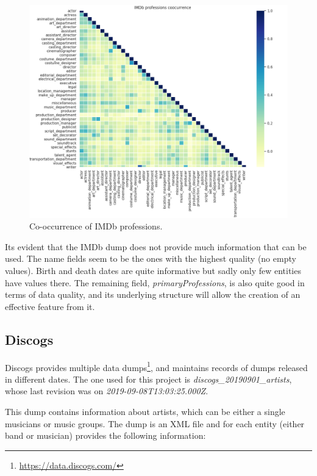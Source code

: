 \documentclass[epsfig,a4paper,11pt,titlepage,twoside,openany]{book}
\newcommand{\footurl}[1]{\footnote{\url{#1}}}
\begin{document}
\begin{figure}[]
  \centering \includegraphics[width=\textwidth]{imdb_profession_coorcurrence}
  \caption{Co-occurrence of IMDb professions.}
  \label{fig:imdb-profession-coocurrence-heatmap}
\end{figure}

Its evident that the IMDb dump does not provide much information that can be used. The name fields seem to be the ones with the highest quality (no empty values). Birth and death dates are quite informative but sadly only few entities have values there. The remaining field, \textit{primaryProfessions}, is also quite good in terms of data quality, and its underlying structure will allow the creation of an effective feature from it.



\subsection{Discogs}
\label{sec:shape-discogs}

Discogs provides multiple data dumps\footurl{https://data.discogs.com/}, and maintains records of dumps released in different dates. The one used for this project is \textit{discogs\_20190901\_artists}, whose last revision was on \textit{2019-09-08T13:03:25.000Z}.

This dump contains information about artists, which can be either a single musicians or music groups. The dump is an XML file and for each entity (either band or musician) provides the following information:
\end{document}
